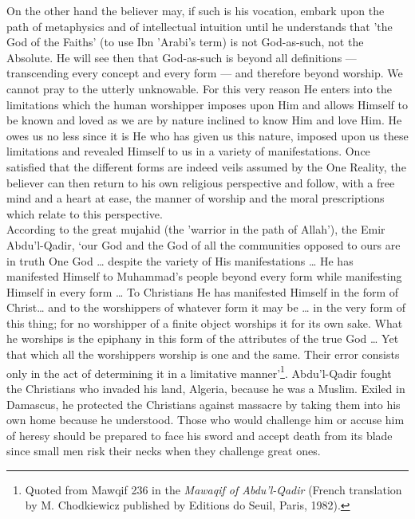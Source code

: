 \documentclass[10pt, twoside,openright]{book}
\begin{document}
On the other hand the believer may, if such is his vocation, embark upon the path of metaphysics and 
of intellectual intuition until he understands that 'the God of the Faiths' (to use Ibn 'Arabi's 
term) is not God\hyp{}as\hyp{}such, not the Absolute. He will see then that God\hyp{}as\hyp{}such is beyond all 
definitions --- transcending every concept and every form --- and therefore beyond worship. We cannot 
pray to the utterly unknowable. For this very reason He enters into the limitations which the human 
worshipper imposes upon Him and allows Himself to be known and loved as we are by nature inclined to 
know Him and love Him. He owes us no less since it is He who has given us this nature, imposed upon 
us these limitations and revealed Himself to us in a variety of manifestations. Once satisfied that 
the different forms are indeed veils assumed by the One Reality, the believer can then return to his 
own religious perspective and follow, with a free mind and a heart at ease, the manner of worship and 
the moral prescriptions which relate to this perspective. \\

According to the great mujahid (the 'warrior in the path of Allah'), the Emir Abdu'l\hyp{}Qadir, `our God 
and the God of all the communities opposed to ours are in truth One God \ldots{} despite the variety of 
His manifestations \ldots{} He has manifested Himself to Muhammad's people beyond every form while 
manifesting Himself in every form \ldots{} To Christians He has manifested Himself in the form of 
Christ\ldots{} and to the worshippers of whatever form it may be \ldots{} in the very form of this thing; for no worshipper of a finite object worships it for its own sake. What he worships is the epiphany in 
this form of the attributes of the true God \ldots{} Yet that which all the worshippers worship is one and 
the same. Their error consists only in the act of determining it in a limitative manner'\footnote{Quoted from Mawqif 236 in the \emph{Mawaqif of Abdu'l\hyp{}Qadir} (French translation by M. Chodkiewicz 
published by Editions do Seuil, Paris, 1982).}. Abdu'l\hyp{}Qadir fought the Christians who invaded his land, Algeria, because he was a Muslim. Exiled in Damascus, he protected the Christians against massacre by taking them into his own home because he understood. Those who would challenge him or accuse him of heresy should be prepared to face his sword and accept death from its blade since small men risk their necks when they challenge great ones. \\
\end{document}
